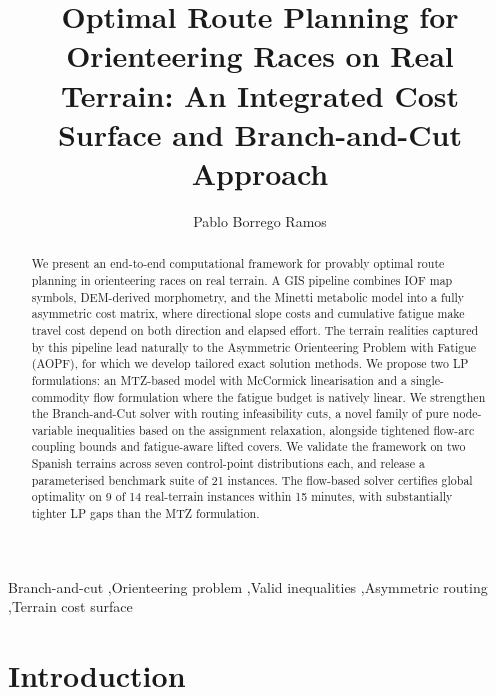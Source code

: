 \documentclass[preprint,11pt]{elsarticle}
\begin{document}
\begin{frontmatter}

\title{Optimal Route Planning for Orienteering Races on Real Terrain:
An Integrated Cost Surface and Branch-and-Cut Approach}

\author[aff1]{Pablo Borrego Ramos}

\address[aff1]{Independent Researcher, Spain}

\begin{abstract}
We present an end-to-end computational framework for provably optimal route planning in orienteering races on real terrain.
A GIS pipeline combines IOF map symbols, DEM-derived morphometry, and the Minetti metabolic model into a fully asymmetric cost matrix, where directional slope costs and cumulative fatigue make travel cost depend on both direction and elapsed effort.
The terrain realities captured by this pipeline lead naturally to the Asymmetric Orienteering Problem with Fatigue (AOPF), for which we develop tailored exact solution methods.
We propose two LP formulations: an MTZ-based model with McCormick linearisation and a single-commodity flow formulation where the fatigue budget is natively linear.
We strengthen the Branch-and-Cut solver with routing infeasibility cuts, a novel family of pure node-variable inequalities based on the assignment relaxation, alongside tightened flow-arc coupling bounds and fatigue-aware lifted covers.
We validate the framework on two Spanish terrains across seven control-point distributions each, and release a parameterised benchmark suite of 21 instances.
The flow-based solver certifies global optimality on 9 of 14 real-terrain instances within 15 minutes, with substantially tighter LP gaps than the MTZ formulation.
\end{abstract}

\begin{keyword}
Branch-and-cut \sep Orienteering problem \sep Valid inequalities \sep Asymmetric routing \sep Terrain cost surface
\end{keyword}

\end{frontmatter}


\section{Introduction}
\label{sec:intro}
\end{document}
